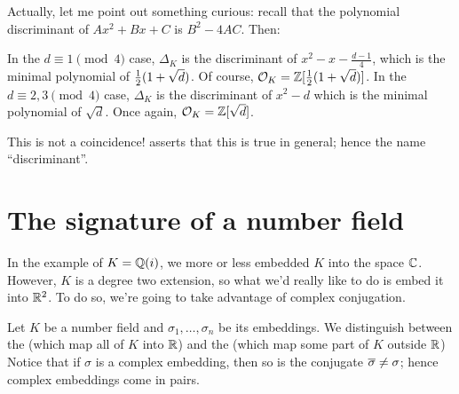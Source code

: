 Actually, let me point out something curious: recall that the polynomial discriminant of $Ax^2+Bx+C$ is $B^2-4AC$. Then:
\begin{itemize}
	\ii In the $d \equiv 1 \pmod 4$ case,
	$\Delta_K$ is the discriminant of $x^2 - x - \frac{d-1}{4}$,
	which is the minimal polynomial of $\frac{1}{2}(1+\sqrt d)$.
	Of course, $\mathcal O_K = \mathbb Z[\frac{1}{2}(1+\sqrt d)]$.
	\ii In the $d \equiv 2,3 \pmod 4$ case,
	$\Delta_K$ is the discriminant of $x^2 - d$
	which is the minimal polynomial of $\sqrt d$. Once again, $\mathcal O_K = \mathbb Z[\sqrt d]$.
\end{itemize}
This is not a coincidence!  asserts that this is true in general;
hence the name ``discriminant''.

\section{The signature of a number field}
In the example of $K = \mathbb Q(i)$,
we more or less embedded $K$ into the space $\mathbb C$.
However, $K$ is a degree two extension,
so what we'd really like to do is embed it into $\mathbb R^2$.
To do so, we're going to take advantage of complex conjugation.

Let $K$ be a number field and $\sigma_1, \dots, \sigma_n$ be its embeddings.
We distinguish between the 
(which map all of $K$ into $\mathbb R$)
and the  
(which map some part of $K$ outside $\mathbb R$)
Notice that if $\sigma$ is a complex embedding,
then so is the conjugate $\overline{\sigma} \ne \sigma$;
hence complex embeddings come in pairs.

